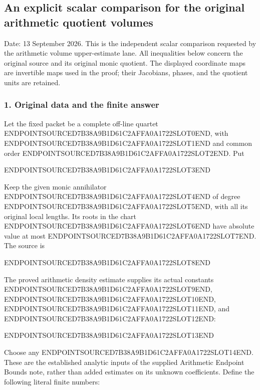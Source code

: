 \subsection{An explicit scalar comparison for the original arithmetic quotient volumes}\label{endpoint-volume_connection_original--an-explicit-scalar-comparison-for-the-original-arithmetic-quotient-volumes}

Date: 13 September 2026. This is the independent scalar comparison requested by the arithmetic volume upper-estimate lane. All inequalities below concern the original source and its original monic quotient. The displayed coordinate maps are invertible maps used in the proof; their Jacobians, phases, and the quotient units are retained.

\subsubsection{1. Original data and the finite answer}\label{endpoint-volume_connection_original--original-data-and-the-finite-answer}

Let the fixed packet be a complete off-line quartet ENDPOINTSOURCED7B38A9B1D61C2AFFA0A1722SLOT0END, with ENDPOINTSOURCED7B38A9B1D61C2AFFA0A1722SLOT1END and common order ENDPOINTSOURCED7B38A9B1D61C2AFFA0A1722SLOT2END. Put

ENDPOINTSOURCED7B38A9B1D61C2AFFA0A1722SLOT3END

Keep the given monic annihilator ENDPOINTSOURCED7B38A9B1D61C2AFFA0A1722SLOT4END of degree ENDPOINTSOURCED7B38A9B1D61C2AFFA0A1722SLOT5END, with all its original local lengths. Its roots in the chart ENDPOINTSOURCED7B38A9B1D61C2AFFA0A1722SLOT6END have absolute value at most ENDPOINTSOURCED7B38A9B1D61C2AFFA0A1722SLOT7END. The source is

ENDPOINTSOURCED7B38A9B1D61C2AFFA0A1722SLOT8END

The proved arithmetic density estimate supplies its actual constants ENDPOINTSOURCED7B38A9B1D61C2AFFA0A1722SLOT9END, ENDPOINTSOURCED7B38A9B1D61C2AFFA0A1722SLOT10END, ENDPOINTSOURCED7B38A9B1D61C2AFFA0A1722SLOT11END, and ENDPOINTSOURCED7B38A9B1D61C2AFFA0A1722SLOT12END:

ENDPOINTSOURCED7B38A9B1D61C2AFFA0A1722SLOT13END

Choose any ENDPOINTSOURCED7B38A9B1D61C2AFFA0A1722SLOT14END. These are the established analytic inputs of the supplied Arithmetic Endpoint Bounds note, rather than added estimates on its unknown coefficients. Define the following literal finite numbers:

